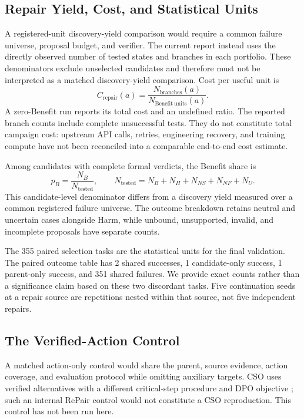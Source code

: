 \subsection{Repair Yield, Cost, and Statistical Units}
\label{app:metrics}
A registered-unit discovery-yield comparison would require a common
failure universe, proposal budget, and verifier. The current report instead
uses the directly observed number of tested states and branches in each
portfolio. These denominators exclude unselected candidates and therefore
must not be interpreted as a matched discovery-yield comparison.
Cost per useful unit is
\begin{equation}
C_{\mathrm{repair}}(a)
=\frac{N_{\mathrm{branches}}(a)}{N_{\mathrm{Benefit\ units}}(a)}.
\label{eq:cost}
\end{equation}
A zero-Benefit run reports its total cost and an undefined ratio.
The reported branch counts include complete unsuccessful tests. They do
not constitute total campaign cost: upstream API calls, retries, engineering
recovery, and training compute have not been reconciled into a comparable
end-to-end cost estimate.

Among candidates with complete formal verdicts, the Benefit share is
\begin{equation}
p_B=\frac{N_B}{N_{\mathrm{tested}}},\qquad
N_{\mathrm{tested}}=N_B+N_H+N_{NS}+N_{NF}+N_U.
\label{eq:precision}
\end{equation}
This candidate-level denominator differs from a discovery yield measured
over a common registered failure universe. The outcome breakdown retains neutral and uncertain cases alongside
Harm, while unbound, unsupported, invalid, and incomplete proposals have
separate counts.


The 355 paired selection tasks are the statistical units for the final
validation. The paired outcome table has 2 shared successes, 1
candidate-only success, 1 parent-only success, and 351 shared failures.
We provide exact counts rather than a significance claim based on these
two discordant tasks. Five continuation seeds at a repair source are
repetitions nested within that source, not five independent repairs.

\subsection{The Verified-Action Control}
\label{app:cso-control}
A matched action-only control would share the parent, source evidence,
action coverage, and evaluation protocol while omitting auxiliary targets.
CSO uses verified alternatives with a different critical-step procedure
and DPO objective \citep{li2026cso}; such an internal RePair control would
not constitute a CSO reproduction. This control has not been run here.

